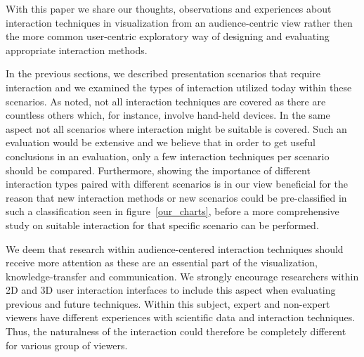 \documentclass[review,journal]{vgtc}         %
\begin{document}
With this paper we share our thoughts, observations and experiences about interaction techniques in visualization from an audience-centric view rather then the more common user-centric exploratory way of designing and evaluating appropriate interaction methods.

In the previous sections, we described presentation scenarios that require interaction and we examined the types of interaction utilized today within these scenarios.
As noted, not all interaction techniques are covered as there are countless others which, for instance, involve hand-held devices.
In the same aspect not all scenarios where interaction might be suitable is covered.
Such an evaluation would be extensive and we believe that in order to get useful conclusions in an evaluation, only a few interaction techniques per scenario should be compared.
Furthermore, showing the importance of different interaction types paired with different scenarios is in our view beneficial for the reason that new interaction methods or new scenarios could be pre-classified in such a classification seen in figure~\ref{our_charts}, before a more comprehensive study on suitable interaction for that specific scenario can be performed.

We deem that research within audience-centered interaction techniques should receive more attention as these are an essential part of the visualization, knowledge-transfer and communication. 
We strongly encourage researchers within 2D and 3D user interaction interfaces to include this aspect when evaluating previous and future techniques.
Within this subject, expert and non-expert viewers have different experiences with scientific data and interaction techniques. Thus, the naturalness of the interaction could therefore be completely different for various group of viewers.


\end{document}
